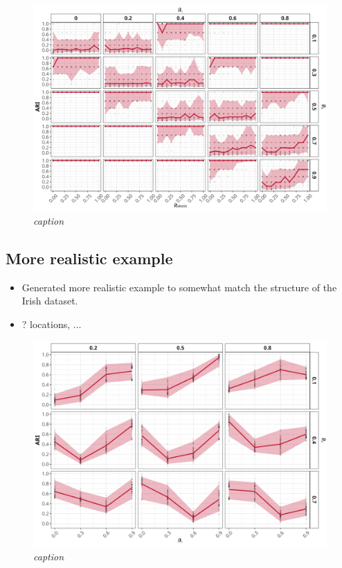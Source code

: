 \documentclass{article}
\numberwithin{equation}{section}
\begin{document}
\begin{figure}[H]
    \centering
    \includegraphics[width = 0.9\linewidth]{plots/sim_01c_js_sens_3_var_dqu_0.9.png}
    \caption{\emph{caption}}
    \label{fig:02_3d}
\end{figure}

\subsection{More realistic example} \label{subsec:sim_realistic}

\begin{itemize}
    \item Generated more realistic example to somewhat match the structure of the Irish dataset. 
    \item ? locations, ... 
\end{itemize}

\begin{figure}[H]
    \centering
    \includegraphics[width = 0.9\linewidth]{plots/sim_01d_js_sens_3_var_dqu_0.9.png}
    \caption{\emph{caption}}
    \label{fig:03_realistic}
\end{figure}
\end{document}
